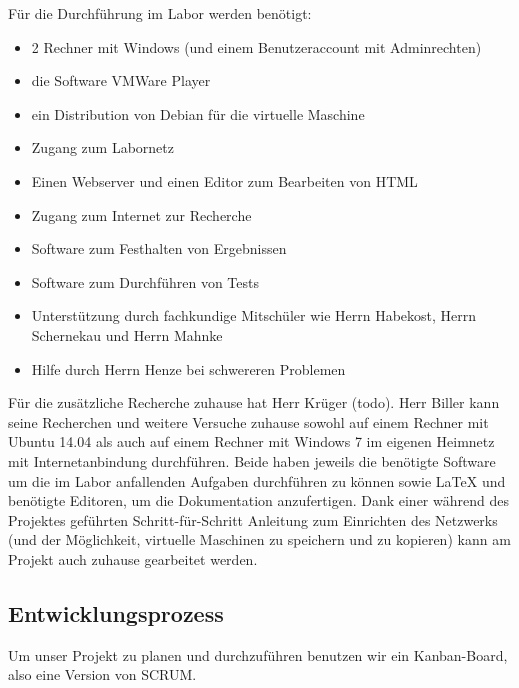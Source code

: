 Für die Durchführung im Labor werden benötigt:
\begin{itemize}
    \item 2 Rechner mit Windows (und einem Benutzeraccount mit Adminrechten)
    \item die Software VMWare Player
    \item ein Distribution von Debian für die virtuelle Maschine
    \item Zugang zum Labornetz
    \item Einen Webserver und einen Editor zum Bearbeiten von HTML
    \item Zugang zum Internet zur Recherche
    \item Software zum Festhalten von Ergebnissen
    \item Software zum Durchführen von Tests
    \item Unterstützung durch fachkundige Mitschüler wie Herrn Habekost, Herrn Schernekau und Herrn Mahnke
    \item Hilfe durch Herrn Henze bei schwereren Problemen
\end{itemize}
    Für die zusätzliche Recherche zuhause hat Herr Krüger (todo). Herr Biller kann seine Recherchen und weitere Versuche zuhause sowohl auf einem Rechner mit Ubuntu 14.04 als auch auf einem Rechner mit Windows 7 im eigenen Heimnetz mit Internetanbindung durchführen. Beide haben jeweils die benötigte Software um die im Labor anfallenden Aufgaben durchführen zu können sowie \LaTeX{} und benötigte Editoren, um die Dokumentation anzufertigen. Dank einer während des Projektes geführten Schritt-für-Schritt Anleitung zum Einrichten des Netzwerks (und der Möglichkeit, virtuelle Maschinen zu speichern und zu kopieren) kann am Projekt auch zuhause gearbeitet werden.

\subsection{Entwicklungsprozess}
\label{sec:Entwicklungsprozess}

    Um unser Projekt zu planen und durchzuführen benutzen wir ein Kanban-Board, also eine Version von SCRUM.
